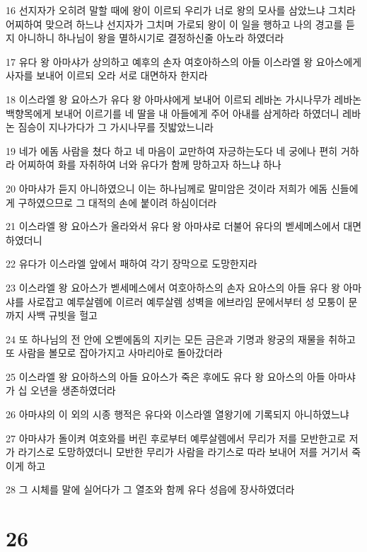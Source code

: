 \par 16 선지자가 오히려 말할 때에 왕이 이르되 우리가 너로 왕의 모사를 삼았느냐 그치라 어찌하여 맞으려 하느냐 선지자가 그치며 가로되 왕이 이 일을 행하고 나의 경고를 듣지 아니하니 하나님이 왕을 멸하시기로 결정하신줄 아노라 하였더라
\par 17 유다 왕 아마샤가 상의하고 예후의 손자 여호아하스의 아들 이스라엘 왕 요아스에게 사자를 보내어 이르되 오라 서로 대면하자 한지라
\par 18 이스라엘 왕 요아스가 유다 왕 아마샤에게 보내어 이르되 레바논 가시나무가 레바논 백향목에게 보내어 이르기를 네 딸을 내 아들에게 주어 아내를 삼게하라 하였더니 레바논 짐승이 지나가다가 그 가시나무를 짓밟았느니라
\par 19 네가 에돔 사람을 쳤다 하고 네 마음이 교만하여 자긍하는도다 네 궁에나 편히 거하라 어찌하여 화를 자취하여 너와 유다가 함께 망하고자 하느냐 하나
\par 20 아마샤가 듣지 아니하였으니 이는 하나님께로 말미암은 것이라 저희가 에돔 신들에게 구하였으므로 그 대적의 손에 붙이려 하심이더라
\par 21 이스라엘 왕 요아스가 올라와서 유다 왕 아마샤로 더불어 유다의 벧세메스에서 대면하였더니
\par 22 유다가 이스라엘 앞에서 패하여 각기 장막으로 도망한지라
\par 23 이스라엘 왕 요아스가 벧세메스에서 여호아하스의 손자 요아스의 아들 유다 왕 아마샤를 사로잡고 예루살렘에 이르러 예루살렘 성벽을 에브라임 문에서부터 성 모퉁이 문까지 사백 규빗을 헐고
\par 24 또 하나님의 전 안에 오벧에돔의 지키는 모든 금은과 기명과 왕궁의 재물을 취하고 또 사람을 볼모로 잡아가지고 사마리아로 돌아갔더라
\par 25 이스라엘 왕 요아하스의 아들 요아스가 죽은 후에도 유다 왕 요아스의 아들 아마샤가 십 오년을 생존하였더라
\par 26 아마샤의 이 외의 시종 행적은 유다와 이스라엘 열왕기에 기록되지 아니하였느냐
\par 27 아마샤가 돌이켜 여호와를 버린 후로부터 예루살렘에서 무리가 저를 모반한고로 저가 라기스로 도망하였더니 모반한 무리가 사람을 라기스로 따라 보내어 저를 거기서 죽이게 하고
\par 28 그 시체를 말에 실어다가 그 열조와 함께 유다 성읍에 장사하였더라

\chapter{26}

